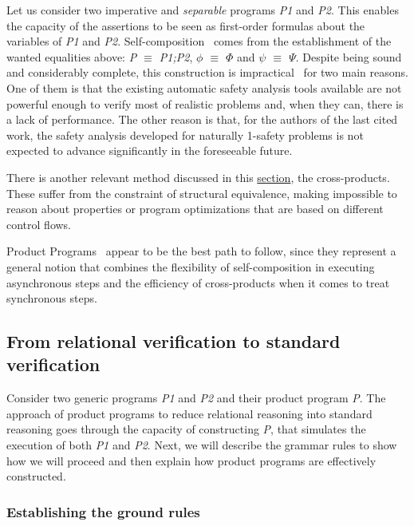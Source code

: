 Let us consider two imperative and \emph{separable} programs \emph{P1} and \emph{P2}.
This enables the capacity of the assertions to be seen as first-order formulas about the variables of \emph{P1} and \emph{P2}.
Self-composition~\cite{DBLP:conf/csfw/BartheDR04} comes from the establishment of the wanted equalities above: \emph{P $\equiv$ P1;P2}, \emph{$\phi$ $\equiv$ $\Phi$} and \emph{$\psi$ $\equiv$ $\Psi$}.
Despite being sound and considerably complete, this construction is impractical~\cite{DBLP:conf/sas/TerauchiA05} for two main reasons.
One of them is that the existing automatic safety analysis tools available are not powerful enough to verify most of realistic problems and, when they can, there is a lack of performance.
The other reason is that, for the authors of the last cited work, the safety analysis developed for naturally 1-safety problems is not expected to advance significantly in the foreseeable future.

There is another relevant method discussed in this \hyperref[sec:cross_products]{section}, the cross-products.
These suffer from the constraint of structural equivalence, making impossible to reason about properties or program optimizations that are based on different control flows.

Product Programs~\cite{DBLP:conf/fm/BartheCK11} appear to be the best path to follow, since they represent a general notion that combines the flexibility of self-composition in executing asynchronous steps and the efficiency of cross-products when it comes to treat synchronous steps. 


\subsection{From relational verification to standard verification} 
\label{subsec:product_programs_relverif_to_stdverif}

Consider two generic programs \emph{P1} and \emph{P2} and their product program \emph{P}.
The approach of product programs to reduce relational reasoning into standard reasoning goes through the capacity of constructing \emph{P}, that simulates the execution of both \emph{P1} and \emph{P2}.
Next, we will describe the grammar rules to show how we will proceed and then explain how product programs are effectively constructed.

\subsubsection{Establishing the ground rules} 
\label{subsubsec:product_programs_ground_rules}

